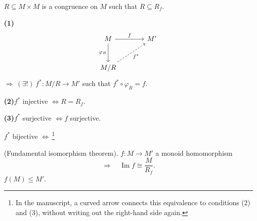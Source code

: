 \noindent $R\subseteq M\times M$ is a congruence on $M$ such that $R\subseteq R_f$.

\bigskip
\noindent\textbf{(1)}
\[
\begin{tikzcd}[column sep=large,row sep=large]
M \arrow[r,"f"] \arrow[d,"\varphi_R"'] & M' \\
M/R \arrow[ur,dashed,"f^{*}"'] &
\end{tikzcd}
\]
\noindent $\Longrightarrow\ (\exists!)\ f^{*}:M/R\longrightarrow M'$ such that
$f^{*}\circ\varphi_R=f$.

\bigskip
\noindent\textbf{(2)}\quad $f^{*}$ injective $\Longleftrightarrow R=R_f$.

\medskip
\noindent\textbf{(3)}\quad $f^{*}$ surjective $\Longleftrightarrow f$ surjective.

\medskip
\noindent $f^{*}$ bijective $\Longleftrightarrow$\,\footnote{In the manuscript, a curved arrow connects this equivalence to conditions (2) and (3), without writing out the right-hand side again.}

\bigskip
\noindent{}\quad (Fundamental isomorphism theorem).\quad
$f:M\longrightarrow M'$ a monoid homomorphism
\[
\Longrightarrow\quad \operatorname{Im} f\cong\frac{M}{R_f}.
\]
\noindent\hfill $f(M)\leq M'$.
